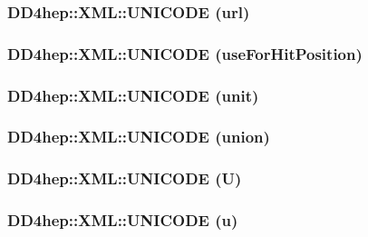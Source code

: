 \label{namespace_d_d4hep_1_1_x_m_l_a7071c039a395501190f53ad700ee9772}
\hypertarget{namespace_d_d4hep_1_1_x_m_l_a29add9e807257ad9eb0af9ebcd8cf77e}{
\subsubsection[{UNICODE}]{\setlength{\rightskip}{0pt plus 5cm}DD4hep::XML::UNICODE (url)}}
\label{namespace_d_d4hep_1_1_x_m_l_a29add9e807257ad9eb0af9ebcd8cf77e}
\hypertarget{namespace_d_d4hep_1_1_x_m_l_a5d336c5ce0a490917ab11d6a0442c8fb}{
\subsubsection[{UNICODE}]{\setlength{\rightskip}{0pt plus 5cm}DD4hep::XML::UNICODE (useForHitPosition)}}
\label{namespace_d_d4hep_1_1_x_m_l_a5d336c5ce0a490917ab11d6a0442c8fb}
\hypertarget{namespace_d_d4hep_1_1_x_m_l_ab95fce74e56fc43c2f945d306e4324c4}{
\subsubsection[{UNICODE}]{\setlength{\rightskip}{0pt plus 5cm}DD4hep::XML::UNICODE (unit)}}
\label{namespace_d_d4hep_1_1_x_m_l_ab95fce74e56fc43c2f945d306e4324c4}
\hypertarget{namespace_d_d4hep_1_1_x_m_l_a7abb10710f27bbb30f24efe95e9645df}{
\subsubsection[{UNICODE}]{\setlength{\rightskip}{0pt plus 5cm}DD4hep::XML::UNICODE (union)}}
\label{namespace_d_d4hep_1_1_x_m_l_a7abb10710f27bbb30f24efe95e9645df}
\hypertarget{namespace_d_d4hep_1_1_x_m_l_a20bac6ae34f50451f6fa8d3a370ea837}{
\subsubsection[{UNICODE}]{\setlength{\rightskip}{0pt plus 5cm}DD4hep::XML::UNICODE (U)}}
\label{namespace_d_d4hep_1_1_x_m_l_a20bac6ae34f50451f6fa8d3a370ea837}
\hypertarget{namespace_d_d4hep_1_1_x_m_l_a59abd1d37fc0ca492051b81ed56cb366}{
\subsubsection[{UNICODE}]{\setlength{\rightskip}{0pt plus 5cm}DD4hep::XML::UNICODE (u)}}
